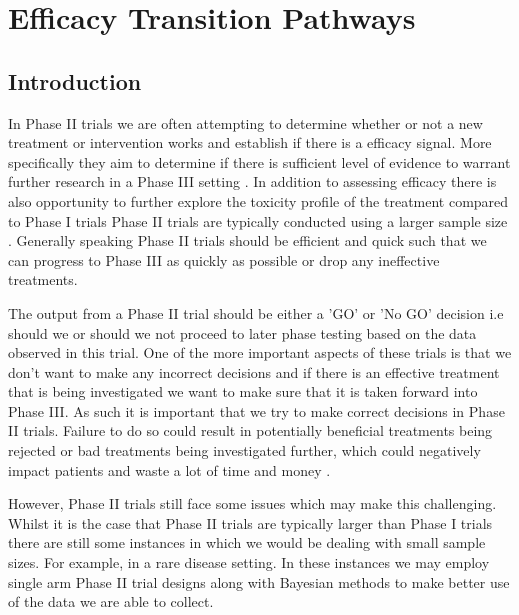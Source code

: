 
\chapter{Efficacy Transition Pathways} %

\label{etp} %


\section{Introduction}
\label{etp:Introduction}

In Phase \RN{2} trials we are often attempting to determine whether or not a new treatment or intervention works and establish if there is a efficacy signal. More specifically they aim to determine if there is sufficient level of evidence to warrant further research in a Phase \RN{3} setting \cite{jungRandomizedPhaseII2014}. In addition to assessing efficacy there is also opportunity to further explore the toxicity profile of the treatment compared to Phase \RN{1} trials Phase \RN{2} trials are typically conducted using a larger sample size \cite{evansFundamentalsClinicalTrial2010}. Generally speaking Phase \RN{2} trials should be efficient and quick such that we can progress to Phase \RN{3} as quickly as possible or drop any ineffective treatments.

The output from a Phase \RN{2} trial should be either a 'GO' or 'No GO' decision i.e should we or should we not proceed to later phase testing based on the data observed in this trial. One of the more important aspects of these trials is that we don't want to make any incorrect decisions and if there is an effective treatment that is being investigated we want to make sure that it is taken forward into Phase \RN{3}. As such it is important that we try to make correct decisions in Phase \RN{2} trials. Failure to do so could result in potentially beneficial treatments being rejected or bad treatments being investigated further, which could negatively impact patients and waste a lot of time and money \cite{vanPhaseIITrials2019}. 

However, Phase \RN{2} trials still face some issues which may make this challenging. Whilst it is the case that Phase \RN{2} trials are typically larger than Phase \RN{1} trials there are still some instances in which we would be dealing with small sample sizes. For example, in a rare disease setting. In these instances we may employ single arm Phase \RN{2} trial designs along with Bayesian methods to make better use of the data we are able to collect. 

